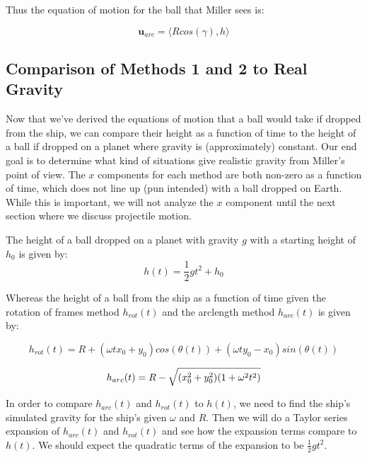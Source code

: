 \documentclass{amsart}
\renewcommand{\vec}{\textbf}
\theoremstyle{definition}
\begin{document}
Thus the equation of motion for the ball that Miller sees is:

\begin{equation}\label{eq:uV1}
    \vec{u}_{arc} = \langle R cos(\gamma), h \rangle
\end{equation}

\subsection*{Comparison of Methods 1 and 2 to Real Gravity}

Now that we've derived the equations of motion that a ball would take
if dropped from the ship, we can compare their height as a function of
time to the height of a ball if dropped on a planet where gravity is
(approximately) constant. Our end goal is to determine what kind of
situations give realistic gravity from Miller's point of view. The $x$
components for each method are both non-zero as a function of time,
which does not line up (pun intended) with a ball dropped on
Earth. While this is important, we will not analyze the $x$ component
until the next section where we discuss projectile motion.

The height of a ball dropped on a planet with gravity $g$ with a starting height of $h_0$ is given by:
\begin{equation}
    h(t)=\frac{1}{2}gt^2 +h_0
\end{equation}

Whereas the height of a ball from the ship as a function of time given the rotation of frames method $h_{rot}(t)$ and the arclength method $h_{arc}(t)$ is given by:

\begin{equation}
    h_{rot}(t) = R+(\omega t x_0 + y_0)cos(\theta(t))+(\omega t y_0 - x_0)sin(\theta (t))
\end{equation}

\begin{equation}
    h_{arc}(t) = R - \sqrt{(x_0^2+y_0^2)(1+\omega^2 t^2)} \\
\end{equation}

In order to compare $h_{arc}(t)$ and $h_{rot}(t)$ to $h(t)$, we need to find the ship's simulated gravity for the ship's given $\omega$ and $R$. Then we will do a Taylor series expansion of $h_{arc}(t)$ and $h_{rot}(t)$ and see how the expansion terms compare to $h(t)$. We should expect the quadratic terms of the expansion to be $\frac{1}{2}gt^2$.
\end{document}
